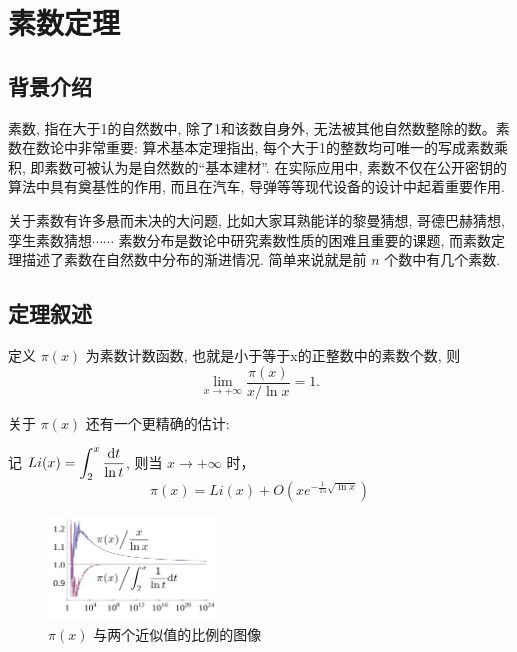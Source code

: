 \documentclass[main]{subfiles}
\def\dif{\textup{d}}
\newcommand{\dis}{\displaystyle}
\begin{document}
\renewcommand{\filename}{素数定理}%
\section{素数定理}
\subsection*{背景介绍}
素数, 指在大于1的自然数中, 除了1和该数自身外, 无法被其他自然数整除的数。素数在数论中非常重要: 算术基本定理指出, 每个大于1的整数均可唯一的写成素数乘积, 即素数可被认为是自然数的“基本建材”.
在实际应用中, 素数不仅在公开密钥的算法中具有奠基性的作用, 而且在汽车, 导弹等等现代设备的设计中起着重要作用.
\par 关于素数有许多悬而未决的大问题, 比如大家耳熟能详的黎曼猜想, 哥德巴赫猜想, 孪生素数猜想$\cdots \cdots$ 素数分布是数论中研究素数性质的困难且重要的课题, 而素数定理描述了素数在自然数中分布的渐进情况. 简单来说就是前 $n$ 个数中有几个素数.
\subsection{定理叙述}
\begin{theorem}[素数定理]
    定义 $\pi(x)$ 为素数计数函数, 也就是小于等于x的正整数中的素数个数, 则
    \[ \lim_{x \rightarrow + \infty} \frac{\pi(x)}{x/ \ln x} = 1. \]
\end{theorem}
关于 $\pi(x)$ 还有一个更精确的估计: 
\begin{theorem}[另一个估计]
    记 $Li(x) = \dis\int_{2}^{x}\dfrac{\dif t}{\ln t}$, 则当 $x \rightarrow + \infty$ 时，
    \[ \pi(x) = Li(x) + O(xe^{-\frac{1}{15} \sqrt{\ln x}}) \]
    
\end{theorem}

\begin{figure}[H]
	\centering
		\includegraphics[width=0.40\textwidth]{pnt1.png}
		 \caption{$\pi(x)$ 与两个近似值的比例的图像}
\end{figure}
\end{document}
